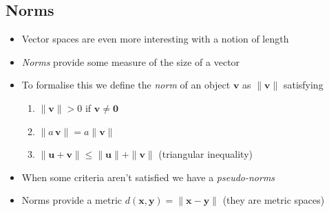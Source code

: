 \begin{slide}
\section[-2]{Norms}

\begin{PauseHighLight}
  \begin{itemize}
  \item Vector spaces are even more interesting with a notion of length\pause
  \item \emph{Norms} provide some measure of the size of a vector\pause
  \item To formalise this we define the \emph{norm} of an object
    $\bm{v}$ as  $\|\bm{v}\|$ satisfying
    \begin{enumerate}
    \item $\| \bm{v} \| >0$ if $\bm{v}\neq\bm{0}$\pause
    \item $\| a\,\bm{v} \| = a \| \bm{v} \|$\pause
    \item $\| \bm{u} + \bm{v} \| \leq \| \bm{u} \| + \| \bm{v} \|$
      \hfill (triangular inequality)\pause
    \end{enumerate}
  \item When some criteria aren't satisfied we have a
    \emph{pseudo-norms}\pause
  \item Norms provide a metric $d(\bm{x}, \bm{y}) = \|\bm{x}-\bm{y}\|$
    (they are metric spaces)\pause
  \end{itemize}
\end{PauseHighLight}

\end{slide}



